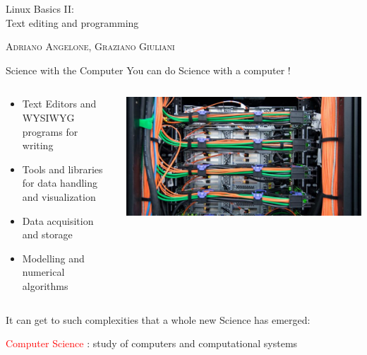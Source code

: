 \documentclass[unknownkeysallowed, 10pt, a4 paper, handout]{beamer}
\begin{document}
\begin{frame}
  \begin{center}


    \begin{block}{}
      \Large
      \centering
      Linux Basics II:\\
      Text editing and programming
    \end{block}

    \vspace{6mm}
    \large
    \textsc{Adriano Angelone, Graziano Giuliani} \\

  \end{center}
\end{frame}


\begin{frame}[label=outline]{Science with the Computer}
  You can do Science with a computer !
  \begin{columns}[T]
    \begin{column}{.53\textwidth}
      \begin{itemize}
        \item Text Editors and WYSIWYG programs for writing
        \item Tools and libraries for data handling and visualization
        \item Data acquisition and storage
        \item Modelling and numerical algorithms
      \end{itemize}
    \end{column}
    \hfill
    \begin{column}{.45\textwidth}
      \vspace{15pt}
      \includegraphics[scale=0.2]{pics/20140924103021_DSC_6759_MHPC.jpg}
    \end{column}
  \end{columns}
  It can get to such complexities that a whole new Science has emerged:
  \begin{center}
    \textcolor{red}{Computer Science} : 
             study of computers and computational systems
  \end{center}
\end{frame}
\end{document}
